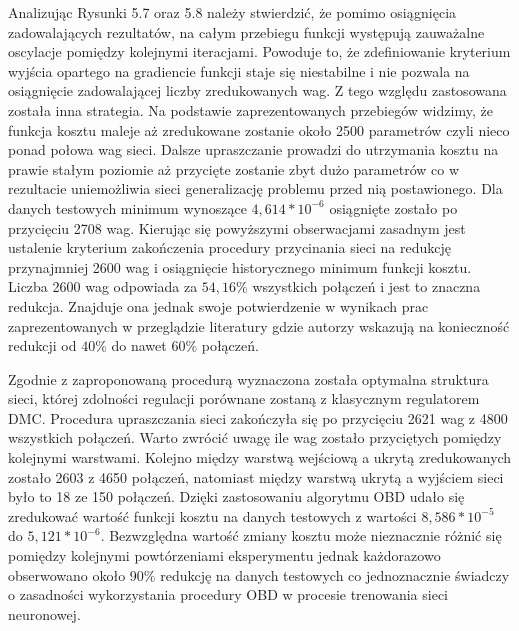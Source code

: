 \par Analizując Rysunki 5.7 oraz 5.8 należy stwierdzić, że pomimo osiągnięcia zadowalających rezultatów, na całym przebiegu funkcji występują zauważalne oscylacje pomiędzy kolejnymi iteracjami. Powoduje to, że zdefiniowanie kryterium wyjścia opartego na gradiencie funkcji staje się niestabilne i nie pozwala na osiągnięcie zadowalającej liczby zredukowanych wag. Z tego względu zastosowana została inna strategia. Na podstawie zaprezentowanych przebiegów widzimy, że funkcja kosztu maleje aż zredukowane zostanie około 2500 parametrów czyli nieco ponad połowa wag sieci. Dalsze upraszczanie prowadzi do utrzymania kosztu na prawie stałym poziomie aż przycięte zostanie zbyt dużo parametrów co w rezultacie uniemożliwia sieci generalizację problemu przed nią postawionego. Dla danych testowych minimum wynoszące \( 4,614*10^{-6} \) osiągnięte zostało po przycięciu 2708 wag. Kierując się powyższymi obserwacjami zasadnym jest ustalenie kryterium zakończenia procedury przycinania sieci na redukcję przynajmniej 2600 wag i osiągnięcie historycznego minimum funkcji kosztu. Liczba 2600 wag odpowiada za \(54,16 \% \) wszystkich połączeń i jest to znaczna redukcja. Znajduje ona jednak swoje potwierdzenie w wynikach prac zaprezentowanych w przeglądzie literatury gdzie autorzy wskazują na konieczność redukcji od \(40\%\) do nawet \(60\%\) połączeń.

\par Zgodnie z zaproponowaną procedurą wyznaczona została optymalna struktura sieci, której zdolności regulacji porównane zostaną z klasycznym regulatorem DMC. Procedura upraszczania sieci zakończyła się po przycięciu 2621 wag z 4800 wszystkich połączeń. Warto zwrócić uwagę ile wag zostało przyciętych pomiędzy kolejnymi warstwami. Kolejno między warstwą wejściową a ukrytą zredukowanych zostało 2603 z 4650 połączeń, natomiast między warstwą ukrytą a wyjściem sieci było to 18 ze 150 połączeń. Dzięki zastosowaniu algorytmu OBD udało się zredukować wartość funkcji kosztu na danych testowych z wartości \( 8,586*10^{-5} \) do \( 5,121*10^{-6} \). Bezwzględna wartość zmiany kosztu może nieznacznie różnić się pomiędzy kolejnymi powtórzeniami eksperymentu jednak każdorazowo obserwowano około 90\% redukcję na danych testowych co jednoznacznie świadczy o zasadności wykorzystania procedury OBD w procesie trenowania sieci neuronowej.

